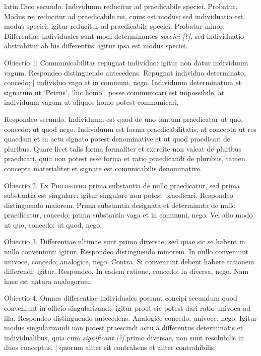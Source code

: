 \begin{otherlanguage*}{latin}
\pstart
 Dico secundo. Individuum reducitur ad praedicabile speciei. Probatur. Modus rei reducitur ad praedicabile rei, cuius est modus; sed individuatio est modus speciei: igitur reducitur ad praedicabile speciei. Probatur minor. Differentiae individuales sunt modi determinantes \emph{speciei [?]}, sed individuatio abstrahitur ab his differentiis: igitur ipsa est modus speciei. 
\pend

\pstart
 Obiectio 1: Communicabilitas repugnat individuo: igitur non datur individuum vagum. Respondeo distinguendo antecedens. Repugnat individuo determinato, concedo; \textnormal{|}   individuo vago et in communi, nego. Individuum determinatum et signatum ut `Petrus', `hic homo', posse communicari est impossibile, at individuum vagum ut aliquos homo potest communicari. 
\pend

\pstart
 Respondeo secundo. Individuum est quod de uno tantum praedicatur ut quo, concedo; ut quod nego. Individuum est forma praedicabilitatis, at concepta ut res quaedam et in actu signato potest denominative et ut quod praedicari de pluribus. Quare licet talis forma formaliter et exercite non valeat de pluribus praedicari, quia non potest esse forma et ratio praedicandi de pluribus, tamen concepta materialiter et signate est comunicabilis denominative. 
\pend

\pstart
 Obiectio 2. Ex \textsc{Philosopho} prima substantia de nullo praedicatur, sed prima substantia est singulare: igitur singulare non potest praedicari. Respondeo distinguendo maiorem. Prima substantia designata et determinata de nullo praedicatur, concedo; prima substantia vaga et in communi, nego. Vel alio modo ut quo, concedo; ut quod, nego. 
\pend

\pstart
 Obiectio 3. Differentiae ultimae sunt primo diversae, sed quae sic se habent in nullo conveniunt: igitur. Respondeo distinguendo minorem. In nullo conveniunt univoce, concedo; analogice, nego. Contra. Si conveniunt debent habere rationem differendi: igitur. Respondeo. In eadem ratione, concedo; in diversa, nego. Nam haec est natura analogorum. 
\pend

\pstart
 Obiectio 4. Omnes differentiae individuales possunt concipi secundum quod conveniunt in officio singularizandi: igitur prout sic potest dari ratio univoca ad illa. Respondeo distinguendo antecedens. Analogice concedo; univoce, nego. Igitur modus singularizandi non potest praescindi actu a differentiis determinatis et individualibus, quia cum \emph{significant [?]} primo diversae, non sunt resolubilis in duos conceptus, \textnormal{|} quorum aliter sit contrahens et aliter contrahibilis. 
\pend


\end{otherlanguage*}
